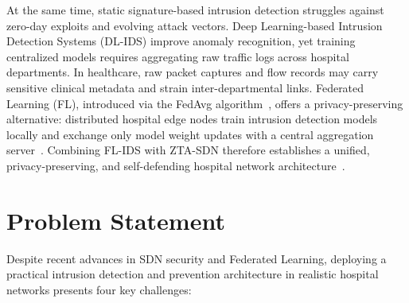 At the same time, static signature-based intrusion detection struggles against zero-day exploits and evolving attack vectors. Deep Learning-based Intrusion Detection Systems (DL-IDS) improve anomaly recognition, yet training centralized models requires aggregating raw traffic logs across hospital departments. In healthcare, raw packet captures and flow records may carry sensitive clinical metadata and strain inter-departmental links. Federated Learning (FL), introduced via the FedAvg algorithm~\cite{mcmahan2017communication}, offers a privacy-preserving alternative: distributed hospital edge nodes train intrusion detection models locally and exchange only model weight updates with a central aggregation server~\cite{javeed2024federated,amiri2023sids}. Combining FL-IDS with ZTA-SDN therefore establishes a unified, privacy-preserving, and self-defending hospital network architecture~\cite{alanazi2026edgeguard,khan2025integrating}.

\section{Problem Statement}
\label{sec:problem_statement}

Despite recent advances in SDN security and Federated Learning, deploying a practical intrusion detection and prevention architecture in realistic hospital networks presents four key challenges:

